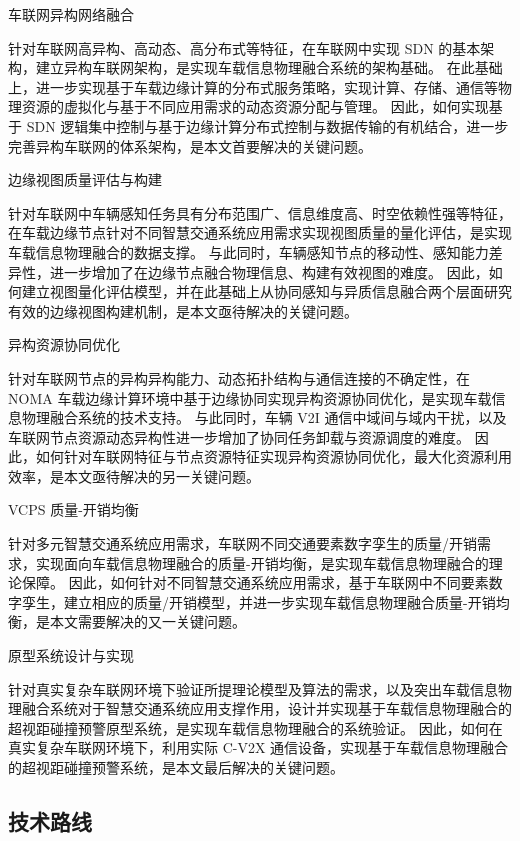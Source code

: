 车联网异构网络融合

针对车联网高异构、高动态、高分布式等特征，在车联网中实现 SDN 的基本架构，建立异构车联网架构，是实现车载信息物理融合系统的架构基础。
在此基础上，进一步实现基于车载边缘计算的分布式服务策略，实现计算、存储、通信等物理资源的虚拟化与基于不同应用需求的动态资源分配与管理。
因此，如何实现基于 SDN 逻辑集中控制与基于边缘计算分布式控制与数据传输的有机结合，进一步完善异构车联网的体系架构，是本文首要解决的关键问题。

 边缘视图质量评估与构建

针对车联网中车辆感知任务具有分布范围广、信息维度高、时空依赖性强等特征，在车载边缘节点针对不同智慧交通系统应用需求实现视图质量的量化评估，是实现车载信息物理融合的数据支撑。
与此同时，车辆感知节点的移动性、感知能力差异性，进一步增加了在边缘节点融合物理信息、构建有效视图的难度。
因此，如何建立视图量化评估模型，并在此基础上从协同感知与异质信息融合两个层面研究有效的边缘视图构建机制，是本文亟待解决的关键问题。

 异构资源协同优化

针对车联网节点的异构异构能力、动态拓扑结构与通信连接的不确定性，在 NOMA 车载边缘计算环境中基于边缘协同实现异构资源协同优化，是实现车载信息物理融合系统的技术支持。
与此同时，车辆 V2I 通信中域间与域内干扰，以及车联网节点资源动态异构性进一步增加了协同任务卸载与资源调度的难度。
因此，如何针对车联网特征与节点资源特征实现异构资源协同优化，最大化资源利用效率，是本文亟待解决的另一关键问题。

 VCPS 质量-开销均衡

针对多元智慧交通系统应用需求，车联网不同交通要素数字孪生的质量/开销需求，实现面向车载信息物理融合的质量-开销均衡，是实现车载信息物理融合的理论保障。
因此，如何针对不同智慧交通系统应用需求，基于车联网中不同要素数字孪生，建立相应的质量/开销模型，并进一步实现车载信息物理融合质量-开销均衡，是本文需要解决的又一关键问题。

 原型系统设计与实现

针对真实复杂车联网环境下验证所提理论模型及算法的需求，以及突出车载信息物理融合系统对于智慧交通系统应用支撑作用，设计并实现基于车载信息物理融合的超视距碰撞预警原型系统，是实现车载信息物理融合的系统验证。
因此，如何在真实复杂车联网环境下，利用实际 C-V2X 通信设备，实现基于车载信息物理融合的超视距碰撞预警系统，是本文最后解决的关键问题。

\subsection{技术路线}

